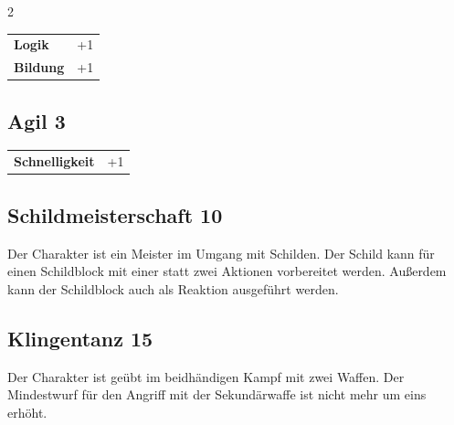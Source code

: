 \begin{multicols}{2}
\begin{tcolorbox}
\vspace{3mm}

\begin{tabular}{@{}ll@{}}
    \textbf{Logik} & +1\\
    \textbf{Bildung} & +1\\
\end{tabular}


\end{tcolorbox}

\begin{tcolorbox}
    \subsection*{Agil \hfill \small{3 }}
    \tcblower




\begin{tabular}{@{}ll@{}}
    \textbf{Schnelligkeit} & +1\\
\end{tabular}


\end{tcolorbox}

\begin{tcolorbox}
    \subsection*{Schildmeisterschaft \hfill \small{10 }}
    \tcblower
Der Charakter ist ein Meister im Umgang mit Schilden. Der Schild kann für einen Schildblock mit einer statt zwei Aktionen vorbereitet werden. Außerdem kann der Schildblock auch als Reaktion ausgeführt werden.


\vspace{3mm}



\end{tcolorbox}

\begin{tcolorbox}
    \subsection*{Klingentanz \hfill \small{15 }}
    \tcblower
Der Charakter ist geübt im beidhändigen Kampf mit zwei Waffen. Der Mindestwurf für den Angriff mit der Sekundärwaffe ist nicht mehr um eins erhöht.



\end{tcolorbox}
\end{multicols}
